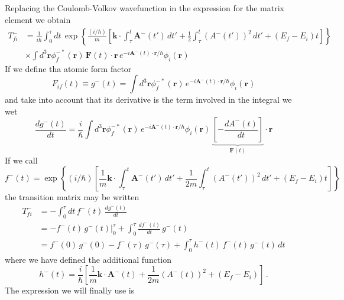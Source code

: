 Replacing the Coulomb-Volkov wavefunction in the expression for the matrix element we obtain
\begin{align}
  T_{fi}^{-} &= \frac{1}{i\hbar} \int_{0}^{\tau} dt \, \exp{\left\{\frac{(i/\hbar)}{m} \left[ \bm{k} \cdot \int_{\tau}^{t}  \bm{A}^{-}(t')\, dt' + \frac{1}{2}\int_{\tau}^{t} \left( A^{-}(t') \right)^{2}\, dt' + (E_{f}-E_{i})t \right] \right\} } \nonumber \\
&\times \int d^{3}\bm{r} \phi^{-*}_{f}(\bm{r}) \, \bm{F}(t) \cdot \bm{r} \, e^{-i \bm{A}^{-}(t) \cdot \bm{r}/\hbar} \phi_{i}(\bm{r}) \nonumber
\end{align}
If we define tha atomic form factor
\begin{equation}\label{Q:def-f_if_t}
F_{if}(t) \equiv g^{-}(t) = \int d^{3}\bm{r} \phi^{-*}_{f}(\bm{r}) \, e^{-i \bm{A}^{-}(t) \cdot \bm{r}/\hbar} \phi_{i}(\bm{r})
\end{equation}
and take into account that its derivative is the term involved in the integral we wet
\begin{equation*}
  \frac{d g^{-}(t)}{dt}= \frac{i}{\hbar} \int d^{3}\bm{r} \phi^{-*}_{f}(\bm{r}) \, e^{-i \bm{A}^{-}(t) \cdot \bm{r}/\hbar} \phi_{i}(\bm{r}) \, \underbrace{\left[- \frac{d A^{-}(t)}{dt} \right]}_{\bm{F}(t)} \cdot \bm{r}
\end{equation*}
If we call
\begin{equation} \label{Q:def-f_t}
  f^{-}(t)= \exp{\left\{(i/\hbar) \left[\frac{1}{m} \bm{k} \cdot \int_{\tau}^{t}  \bm{A}^{-}(t')\, dt' + \frac{1}{2m}\int_{\tau}^{t} \left( A^{-}(t') \right)^{2}\, dt' + (E_{f}-E_{i})t \right] \right\} }
\end{equation}
the transition matrix may be written
\begin{align}
  T_{fi}^{-}&= - \int_{0}^{\tau} dt \, f^{-}(t)\, \frac{d g^{-}(t)}{dt} \nonumber \\
  &=\left. -f^{-}(t)\, g^{-}(t) \right|_{0}^{\tau} + \int_{0}^{\tau}  \frac{d f^{-}(t)}{dt}\, g^{-}(t)
\nonumber \\
&= f^{-}(0)\, g^{-}(0) - f^{-}(\tau)\, g^{-}(\tau) + \int_{0}^{\tau} h^{-}(t)\, f^{-}(t)\, g^{-}(t)\, dt
\end{align}
where we have defined the additional function
\begin{equation}\label{Q:def-h_t}
h^{-}(t)= \frac{i}{\hbar} \left[\frac{1}{m} \bm{k} \cdot \bm{A}^{-}(t) + \frac{1}{2m} \left( A^{-}(t) \right)^{2} + (E_{f}-E_{i}) \right] \,.
\end{equation}
The expression we will finally use is
